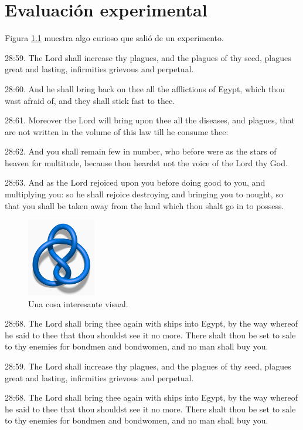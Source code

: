 \chapter{Evaluaci\'{o}n experimental}

Figura \ref{interesante} muestra algo curioso que sali\'{o} de un
experimento.


28:59. The Lord shall increase thy plagues, and the plagues of thy
seed, plagues great and lasting, infirmities grievous and perpetual.

28:60. And he shall bring back on thee all the afflictions of Egypt,
which thou wast afraid of, and they shall stick fast to thee.

28:61. Moreover the Lord will bring upon thee all the diseases, and
plagues, that are not written in the volume of this law till he consume
thee:

28:62. And you shall remain few in number, who before were as the stars
of heaven for multitude, because thou heardst not the voice of the Lord
thy God.

28:63. And as the Lord rejoiced upon you before doing good to you, and
multiplying you: so he shall rejoice destroying and bringing you to
nought, so that you shall be taken away from the land which thou shalt
go in to possess.


\begin{figure}
\centerline{\includegraphics[width=30mm]{interesante.png}}
\caption{Una cosa interesante visual.}
\label{interesante}
\end{figure}


28:68. The Lord shall bring thee again with ships into Egypt, by the
way whereof he said to thee that thou shouldst see it no more. There
shalt thou be set to sale to thy enemies for bondmen and bondwomen, and
no man shall buy you.

28:59. The Lord shall increase thy plagues, and the plagues of thy
seed, plagues great and lasting, infirmities grievous and perpetual.

28:68. The Lord shall bring thee again with ships into Egypt, by the
way whereof he said to thee that thou shouldst see it no more. There
shalt thou be set to sale to thy enemies for bondmen and bondwomen, and
no man shall buy you.
